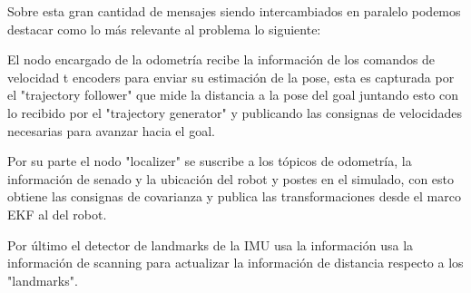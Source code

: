 

Sobre esta gran cantidad de mensajes siendo intercambiados en paralelo podemos destacar como lo más relevante al problema lo siguiente:

El nodo encargado de la odometría recibe la información de los comandos de velocidad t encoders para enviar su estimación de la pose, esta es capturada por el "trajectory follower" que mide la distancia a la pose del goal juntando esto con lo recibido por el "trajectory generator" y publicando las consignas de velocidades necesarias para avanzar hacia el goal.

Por su parte el nodo "localizer" se suscribe a los tópicos de odometría, la información de senado y la ubicación del robot y postes en el simulado, con esto obtiene las consignas de covarianza y publica las transformaciones desde el marco EKF al del robot.

Por último el detector de landmarks de la IMU usa la información usa la información de scanning para actualizar la información de distancia respecto a los "landmarks".


